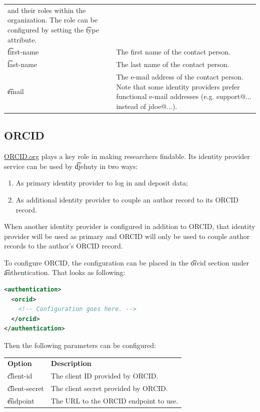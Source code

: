 \begin{tabularx}{\textwidth}{*{1}{!{\VRule[-1pt]}l}!{\VRule[-1pt]}X}
                                 and their roles within the organization. The
                                 role can be configured by setting the \t{type}
                                 attribute.\\
  \cfgindent\cfgindent\t{first-name} & The first name of the contact person.\\
  \cfgindent\cfgindent\t{last-name} & The last name of the contact person.\\
  \cfgindent\cfgindent\t{email} & The e-mail address of the contact person.
                                  Note that some identity providers prefer
                                  functional e-mail addresses (e.g. support@...
                                  instead of jdoe@...).
\end{tabularx}

\subsection{ORCID}

  \href{https://orcid.org}{ORCID.org} plays a key role in making researchers
  findable.  Its identity provider service can be used by \t{djehuty} in two ways:
  \begin{enumerate}
  \item{As primary identity provider to log in and deposit data;}
  \item{As additional identity provider to couple an author record to its ORCID record.}
  \end{enumerate}

  When another identity provider is configured in addition to ORCID, that
  identity provider will be used as primary and ORCID will only be used to
  couple author records to the author's ORCID record.

  To configure ORCID, the configuration can be placed in the \t{orcid}
  section under \t{authentication}.  That looks as following:

\begin{lstlisting}[language=xml]
<authentication>
  <orcid>
    <!-- Configuration goes here. -->
  </orcid>
</authentication>
\end{lstlisting}

  Then the following parameters can be configured:

\begin{tabularx}{\textwidth}{*{1}{!{\VRule[-1pt]}l}!{\VRule[-1pt]}X}
  \headrow
  \textbf{Option}             & \textbf{Description}\\
  \t{client-id}               & The client ID provided by ORCID.\\
  \t{client-secret}           & The client secret provided by ORCID.\\
  \t{endpoint}                & The URL to the ORCID endpoint to use.
\end{tabularx}

